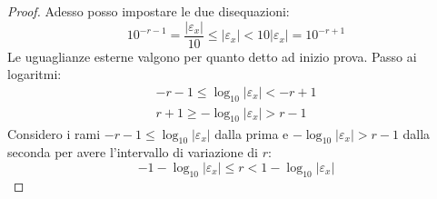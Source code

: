 \begin{proof}
Adesso posso impostare le due disequazioni:
\begin{equation*}
	10^{-r -1} = \frac{\left | \varepsilon_{x} \right |}{10} \le 
		\left | \varepsilon_{x} \right | <
	10 \left | \varepsilon_{x} \right | = 10^{-r +1}
\end{equation*}
Le uguaglianze esterne valgono per quanto detto ad inizio prova.
Passo ai logaritmi:
\begin{equation*}
	\begin{split}
		-r-1 \leq  \log_{10}{|\varepsilon_{x}|} < -r+1 \\
		r+1 \geq -\log_{10}{|\varepsilon_{x}|} > r-1
	\end{split}
\end{equation*}
Considero i rami $-r-1 \leq  \log_{10}{|\varepsilon_{x}|}$ dalla prima e 
$-\log_{10}{|\varepsilon_{x}|} > r-1$ dalla seconda per avere l'intervallo di variazione di $r$:
\begin{equation*}
	-1 - \log_{10}{|\varepsilon_{x}|} \leq r < 1 - \log_{10}{|\varepsilon_{x}|}
\end{equation*}
\end{proof}

